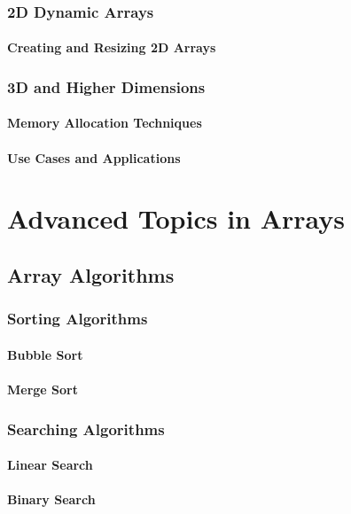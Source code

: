 \documentclass{book}
\begin{document}
	\subsection{2D Dynamic Arrays}
	\subsubsection{Creating and Resizing 2D Arrays}
	\subsection{3D and Higher Dimensions}
	\subsubsection{Memory Allocation Techniques}
	\subsubsection{Use Cases and Applications}
	
	\chapter{Advanced Topics in Arrays}
	\section{Array Algorithms}
	\subsection{Sorting Algorithms}
	\subsubsection{Bubble Sort}
	\subsubsection{Merge Sort}
	\subsection{Searching Algorithms}
	\subsubsection{Linear Search}
	\subsubsection{Binary Search}
	
\end{document}
